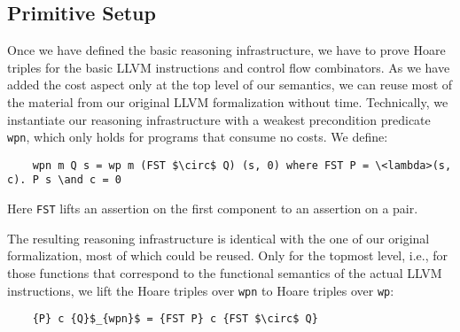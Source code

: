 \documentclass[acmsmall]{acmart}
\newcommand{\is}{\lstinline[language=isabelle]}
\begin{document}


\subsection{Primitive Setup}
Once we have defined the basic reasoning infrastructure, we have to prove Hoare triples for
the basic LLVM instructions and control flow combinators. As we have added the cost aspect only at the top level of our semantics, we can reuse most of the material from our original LLVM formalization without time. 
Technically, we instantiate our reasoning infrastructure with a weakest precondition predicate
\is{wpn}, which only holds for programs that consume no costs.
We define:
\begin{lstlisting}
    wpn m Q s = wp m (FST $\circ$ Q) (s, 0) where FST P = \<lambda>(s, c). P s \and c = 0
\end{lstlisting}
Here \is{FST} lifts an assertion on the first component to an assertion on a pair.

The resulting reasoning infrastructure is identical with the one of our original formalization, most of which could be reused. Only for the topmost level, i.e., for those functions that correspond to the functional semantics of the actual LLVM instructions, we lift the Hoare triples over \is{wpn} to Hoare triples over \is{wp}:
\begin{lstlisting}
    {P} c {Q}$_{wpn}$ = {FST P} c {FST $\circ$ Q}
\end{lstlisting}
\end{document}
